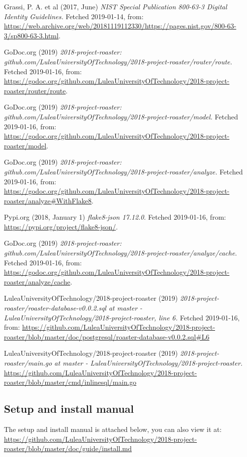 \documentclass[12pt,a4paper]{report}
\begin{document}
{\begin{thebibliography}{1}
 Grassi, P. A. et al (2017, June) {\em NIST Special Publication 800-63-3 Digital Identity Guidelines.} Fetched 2019-01-14, from: \url{https://web.archive.org/web/20181119112330/https://pages.nist.gov/800-63-3/sp800-63-3.html}.

 GoDoc.org (2019) {\em 2018-project-roaster: github.com/LuleaUniversityOfTechnology/2018-project-roaster/router/route.}
Fetched 2019-01-16, from:
\url{https://godoc.org/github.com/LuleaUniversityOfTechnology/2018-project-roaster/router/route}.

 GoDoc.org (2019) {\em 2018-project-roaster: github.com/LuleaUniversityOfTechnology/2018-project-roaster/model.}
Fetched 2019-01-16, from:
\url{https://godoc.org/github.com/LuleaUniversityOfTechnology/2018-project-roaster/model}.

 GoDoc.org (2019) {\em 2018-project-roaster: github.com/LuleaUniversityOfTechnology/2018-project-roaster/analyze.} Fetched 2019-01-16, from: \url{https://godoc.org/github.com/LuleaUniversityOfTechnology/2018-project-roaster/analyze#WithFlake8}.

 Pypi.org (2018, January 1) {\em flake8-json 17.12.0}. Fetched 2019-01-16, from: \url{https://pypi.org/project/flake8-json/}.

 GoDoc.org (2019) {\em 2018-project-roaster: github.com/LuleaUniversityOfTechnology/2018-project-roaster/analyze/cache.} Fetched 2019-01-16, from: \url{https://godoc.org/github.com/LuleaUniversityOfTechnology/2018-project-roaster/analyze/cache}.

 LuleaUniversityOfTechnology/2018-project-roaster (2019) {\em 2018-project-roaster/roaster-database-v0.0.2.sql at master - LuleaUniversityOfTechnology/2018-project-roaster, line 6.}
Fetched 2019-01-16, from: \url{https://github.com/LuleaUniversityOfTechnology/2018-project-roaster/blob/master/doc/postgresql/roaster-database-v0.0.2.sql#L6}

 LuleaUniversityOfTechnology/2018-project-roaster (2019) {\em 2018-project-roaster/main.go at master - LuleaUniversityOfTechnology/2018-project-roaster.} \url{https://github.com/LuleaUniversityOfTechnology/2018-project-roaster/blob/master/cmd/inlinesql/main.go}

\end{thebibliography}}

\begin{appendix}
\chapter{Setup and install manual}
The setup and install manual is attached below, you can also view it at: \\ \url{https://github.com/LuleaUniversityOfTechnology/2018-project-roaster/blob/master/doc/guide/install.md}

\end{appendix}
\end{document}
